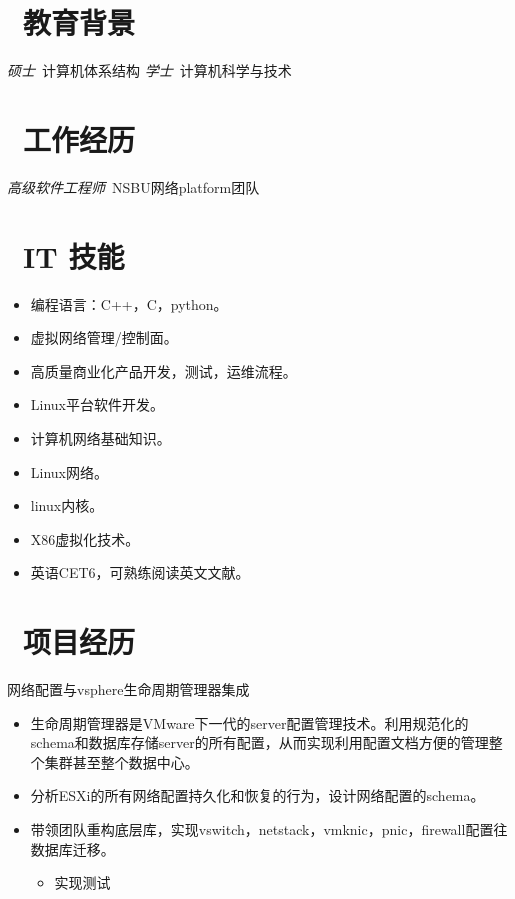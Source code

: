 \documentclass{resume}
\begin{document}


 
\section{\faGraduationCap\  教育背景}
\textit{硕士}\ 计算机体系结构
\textit{学士}\ 计算机科学与技术

\section{\faWrench\  工作经历}
\textit{高级软件工程师}\  NSBU网络platform团队

\section{\faCogs\ IT 技能}
\begin{itemize}[parsep=0.5ex]
  \item 编程语言：C++，C，python。
  \item 虚拟网络管理/控制面。
  \item 高质量商业化产品开发，测试，运维流程。
  \item Linux平台软件开发。
  \item 计算机网络基础知识。
  \item Linux网络。
  \item linux内核。
  \item X86虚拟化技术。
  \item 英语CET6，可熟练阅读英文文献。
\end{itemize}

\section{\faUsers\ 项目经历}
网络配置与vsphere生命周期管理器集成
\begin{itemize}
  \item 生命周期管理器是VMware下一代的server配置管理技术。利用规范化的schema和数据库存储server的所有配置，从而实现利用配置文档方便的管理整个集群甚至整个数据中心。
  \item 分析ESXi的所有网络配置持久化和恢复的行为，设计网络配置的schema。
  \item 带领团队重构底层库，实现vswitch，netstack，vmknic，pnic，firewall配置往数据库迁移。
  \begin{itemize}
    \item 实现测试
  \end{itemize}
\end{itemize}
\end{document}
